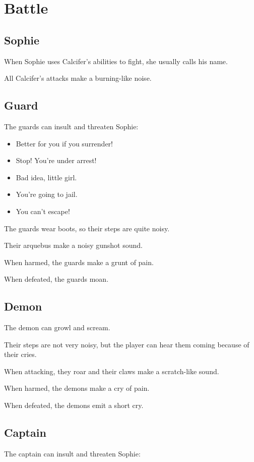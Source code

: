 \section{Battle}

\subsection{Sophie}
When Sophie uses Calcifer's abilities to fight, she usually calls his name.

All Calcifer's attacks make a burning-like noise.

\subsection{Guard}
The guards can insult and threaten Sophie:
\begin{itemize}
	\item Better for you if you surrender!
	\item Stop! You're under arrest!
	\item Bad idea, little girl.
	\item You're going to jail.
	\item You can't escape!
\end{itemize}

The guards wear boots, so their steps are quite noisy.

Their arquebus make a noisy gunshot sound.

When harmed, the guards make a grunt of pain.

When defeated, the guards moan.

\subsection{Demon}
The demon can growl and scream.

Their steps are not very noisy, but the player can hear them coming because of their cries.

When attacking, they roar and their claws make a scratch-like sound.

When harmed, the demons make a cry of pain.

When defeated, the demons emit a short cry.

\subsection{Captain}
The captain can insult and threaten Sophie:

